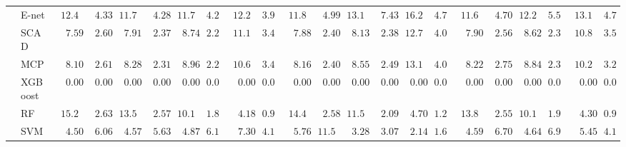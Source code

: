 \begin{tabular}{ll|ll|llllll|llllll|llllll}
 & E-net  & $\phantom{0}12.40$ & $\phantom{00}4.33$ & $\phantom{0}11.79$ & $\phantom{00}4.28$ & $\phantom{0}11.71$ & $\phantom{0}4.24$ & $\phantom{0}12.24$ & $\phantom{0}3.99$ & $\phantom{0}11.80$ & $\phantom{00}4.99$ & $\phantom{0}13.10$ & $\phantom{00}7.43$ & $\phantom{0}16.28$ & $\phantom{0}4.73$ & $\phantom{0}11.69$ & $\phantom{00}4.70$ & $\phantom{0}12.28$ & $\phantom{0}5.57$ & $\phantom{0}13.17$ & $\phantom{0}4.74$ \\
 & SCAD  & $\phantom{00}7.59$ & $\phantom{00}2.60$ & $\phantom{00}7.91$ & $\phantom{00}2.37$ & $\phantom{00}8.74$ & $\phantom{0}2.22$ & $\phantom{0}11.14$ & $\phantom{0}3.41$ & $\phantom{00}7.88$ & $\phantom{00}2.40$ & $\phantom{00}8.13$ & $\phantom{00}2.38$ & $\phantom{0}12.79$ & $\phantom{0}4.04$ & $\phantom{00}7.90$ & $\phantom{00}2.56$ & $\phantom{00}8.62$ & $\phantom{0}2.33$ & $\phantom{0}10.80$ & $\phantom{0}3.56$ \\
 & MCP  & $\phantom{00}8.10$ & $\phantom{00}2.61$ & $\phantom{00}8.28$ & $\phantom{00}2.31$ & $\phantom{00}8.96$ & $\phantom{0}2.26$ & $\phantom{0}10.66$ & $\phantom{0}3.47$ & $\phantom{00}8.16$ & $\phantom{00}2.40$ & $\phantom{00}8.55$ & $\phantom{00}2.49$ & $\phantom{0}13.12$ & $\phantom{0}4.02$ & $\phantom{00}8.22$ & $\phantom{00}2.75$ & $\phantom{00}8.84$ & $\phantom{0}2.31$ & $\phantom{0}10.22$ & $\phantom{0}3.28$ \\
 & XGBoost  & $\phantom{00}0.00$ & $\phantom{00}0.00$ & $\phantom{00}0.00$ & $\phantom{00}0.00$ & $\phantom{00}0.00$ & $\phantom{0}0.00$ & $\phantom{00}0.00$ & $\phantom{0}0.01$ & $\phantom{00}0.00$ & $\phantom{00}0.00$ & $\phantom{00}0.00$ & $\phantom{00}0.00$ & $\phantom{00}0.00$ & $\phantom{0}0.00$ & $\phantom{00}0.00$ & $\phantom{00}0.00$ & $\phantom{00}0.00$ & $\phantom{0}0.00$ & $\phantom{00}0.00$ & $\phantom{0}0.00$ \\
 & RF  & $\phantom{0}15.26$ & $\phantom{00}2.63$ & $\phantom{0}13.54$ & $\phantom{00}2.57$ & $\phantom{0}10.19$ & $\phantom{0}1.83$ & $\phantom{00}4.18$ & $\phantom{0}0.95$ & $\phantom{0}14.41$ & $\phantom{00}2.58$ & $\phantom{0}11.51$ & $\phantom{00}2.09$ & $\phantom{00}4.70$ & $\phantom{0}1.22$ & $\phantom{0}13.82$ & $\phantom{00}2.55$ & $\phantom{0}10.11$ & $\phantom{0}1.95$ & $\phantom{00}4.30$ & $\phantom{0}0.94$ \\
 & SVM  & $\phantom{00}4.50$ & $\phantom{00}6.06$ & $\phantom{00}4.57$ & $\phantom{00}5.63$ & $\phantom{00}4.87$ & $\phantom{0}6.13$ & $\phantom{00}7.30$ & $\phantom{0}4.15$ & $\phantom{00}5.76$ & $\phantom{0}11.52$ & $\phantom{00}3.28$ & $\phantom{00}3.07$ & $\phantom{00}2.14$ & $\phantom{0}1.64$ & $\phantom{00}4.59$ & $\phantom{00}6.70$ & $\phantom{00}4.64$ & $\phantom{0}6.94$ & $\phantom{00}5.45$ & $\phantom{0}4.15$ \\\hline

\end{tabular}
